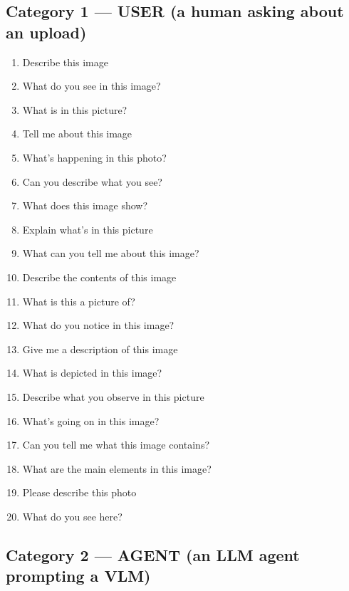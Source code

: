\subsection*{Category 1 --- USER (a human asking about an upload)}

\begin{enumerate}[leftmargin=*, itemsep=1pt]
  \item Describe this image
  \item What do you see in this image?
  \item What is in this picture?
  \item Tell me about this image
  \item What's happening in this photo?
  \item Can you describe what you see?
  \item What does this image show?
  \item Explain what's in this picture
  \item What can you tell me about this image?
  \item Describe the contents of this image
  \item What is this a picture of?
  \item What do you notice in this image?
  \item Give me a description of this image
  \item What is depicted in this image?
  \item Describe what you observe in this picture
  \item What's going on in this image?
  \item Can you tell me what this image contains?
  \item What are the main elements in this image?
  \item Please describe this photo
  \item What do you see here?
\end{enumerate}

\subsection*{Category 2 --- AGENT (an LLM agent prompting a VLM)}

